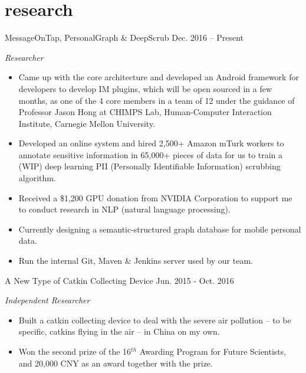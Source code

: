 \documentclass[hidelinks__VERSION__]{adamyi-cv} %
\begin{document}
\section{research}

\begin{entrylist}


\entry
{MessageOnTap, PersonalGraph \& DeepScrub}
{Dec. 2016 -- Present}
{\emph{Researcher}
\begin{itemize}
\item Came up with the core architecture and developed an Android framework for developers to develop IM plugins, which will be open sourced in a few months, as one of the 4 core members in a team of 12 under the guidance of Professor Jason Hong at CHIMPS Lab, Human-Computer Interaction Institute, Carnegie Mellon University.
\item Developed an online system and hired 2,500+ Amazon mTurk workers to annotate sensitive information in 65,000+ pieces of data for us to train a (WIP) deep learning PII (Personally Identifiable Information) scrubbing algorithm.
\item Received a \$1,200 GPU donation from NVIDIA Corporation to support me to conduct research in NLP (natural language processing).
\item Currently designing a semantic-structured graph database for mobile personal data.
\item Run the internal Git, Maven \& Jenkins server used by our team.
\end{itemize}}


\entry
{A New Type of Catkin Collecting Device}
{Jun. 2015 - Oct. 2016}
{\emph{Independent Researcher}
\begin{itemize}
\item Built a catkin collecting device to deal with the severe air pollution – to be specific, catkins flying in the air – in China on my own.
\item Won the second prize of the 16$^{th}$ Awarding Program for Future Scientists, and 20,000 CNY as an award together with the prize.
\end{itemize}}



\end{entrylist}
\end{document}
